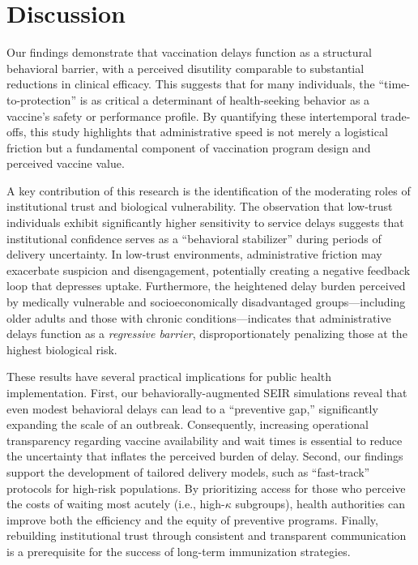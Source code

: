 \section{Discussion}
\label{sec:discussion}

Our findings demonstrate that vaccination delays function as a structural behavioral barrier, with a perceived disutility comparable to substantial reductions in clinical efficacy. This suggests that for many individuals, the ``time-to-protection'' is as critical a determinant of health-seeking behavior as a vaccine's safety or performance profile. By quantifying these intertemporal trade-offs, this study highlights that administrative speed is not merely a logistical friction but a fundamental component of vaccination program design and perceived vaccine value.

A key contribution of this research is the identification of the moderating roles of institutional trust and biological vulnerability. The observation that low-trust individuals exhibit significantly higher sensitivity to service delays suggests that institutional confidence serves as a ``behavioral stabilizer'' during periods of delivery uncertainty. In low-trust environments, administrative friction may exacerbate suspicion and disengagement, potentially creating a negative feedback loop that depresses uptake. Furthermore, the heightened delay burden perceived by medically vulnerable and socioeconomically disadvantaged groups---including older adults and those with chronic conditions---indicates that administrative delays function as a \textit{regressive barrier}, disproportionately penalizing those at the highest biological risk.

These results have several practical implications for public health implementation. First, our behaviorally-augmented SEIR simulations reveal that even modest behavioral delays can lead to a ``preventive gap,'' significantly expanding the scale of an outbreak. Consequently, increasing operational transparency regarding vaccine availability and wait times is essential to reduce the uncertainty that inflates the perceived burden of delay. Second, our findings support the development of tailored delivery models, such as ``fast-track'' protocols for high-risk populations. By prioritizing access for those who perceive the costs of waiting most acutely (i.e., high-$\kappa$ subgroups), health authorities can improve both the efficiency and the equity of preventive programs. Finally, rebuilding institutional trust through consistent and transparent communication is a prerequisite for the success of long-term immunization strategies.


